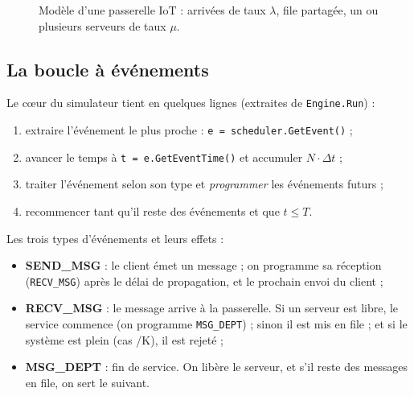 \documentclass[11pt,a4paper]{article}
\begin{document}
\begin{figure}[h]
\centering
{}
\caption{Modèle d'une passerelle IoT : arrivées de taux $\lambda$, file
partagée, un ou plusieurs serveurs de taux $\mu$.}
\label{fig:archi}
\end{figure}

\subsection{La boucle à événements}
Le c\oe ur du simulateur tient en quelques lignes (extraites de \texttt{Engine.Run}) :
\begin{enumerate}
  \item extraire l'événement le plus proche : \texttt{e = scheduler.GetEvent()} ;
  \item avancer le temps à \texttt{t = e.GetEventTime()} et accumuler $N\cdot\Delta t$ ;
  \item traiter l'événement selon son type et \emph{programmer} les événements futurs ;
  \item recommencer tant qu'il reste des événements et que $t \le T$.
\end{enumerate}

Les trois types d'événements et leurs effets :
\begin{itemize}
  \item \textbf{SEND\_MSG} : le client émet un message ; on programme sa réception
        (\texttt{RECV\_MSG}) après le délai de propagation, et le prochain envoi du client ;
  \item \textbf{RECV\_MSG} : le message arrive à la passerelle. Si un serveur est
        libre, le service commence (on programme \texttt{MSG\_DEPT}) ; sinon il est
        mis en file ; et si le système est plein (cas /K), il est rejeté ;
  \item \textbf{MSG\_DEPT} : fin de service. On libère le serveur, et s'il reste des
        messages en file, on sert le suivant.
\end{itemize}
\end{document}
